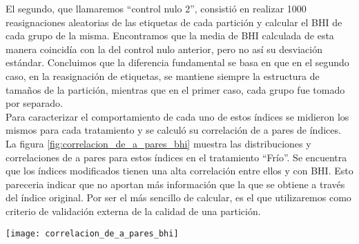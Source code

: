 El segundo, que llamaremos ``control nulo 2'', consistió en realizar 1000 reasignaciones aleatorias de las etiquetas de cada partición y calcular el BHI de cada grupo de la misma. Encontramos que la media de BHI calculada de esta manera coincidía con la del control nulo anterior, pero no así su desviación estándar. Concluimos que la diferencia fundamental se basa en que en el segundo caso, en la reasignación de etiquetas, se mantiene siempre la estructura de tamaños de la partición, mientras que en el primer caso, cada grupo fue tomado por separado.\\
Para caracterizar el comportamiento de cada uno de estos índices se midieron los mismos para cada tratamiento y se calculó su correlación de a pares de índices. La figura \ref{fig:correlacion_de_a_pares_bhi} muestra las distribuciones y correlaciones de a pares para estos índices en el tratamiento ``Frío''. Se encuentra que los índices modificados tienen una alta correlación entre ellos y con BHI. Esto pareceria indicar que no aportan más información que la que se obtiene a través del índice original. Por ser el más sencillo de calcular, es el que utilizaremos como criterio de validación externa de la calidad de una partición.
\begin{sidewaysfigure}
    \centering
    \texttt{[image: correlacion\_de\_a\_pares\_bhi]}
    \caption{Correlación de a pares para los distintos índices de homogeneidad biológica presentados para cada uno de los grupos del tratamiento 'Frío' obtenidos con $ds=1$. Se observa que todos los índices tienen una alta correlación entre si.}
    \label{fig:correlacion_de_a_pares_bhi}
\end{sidewaysfigure}


